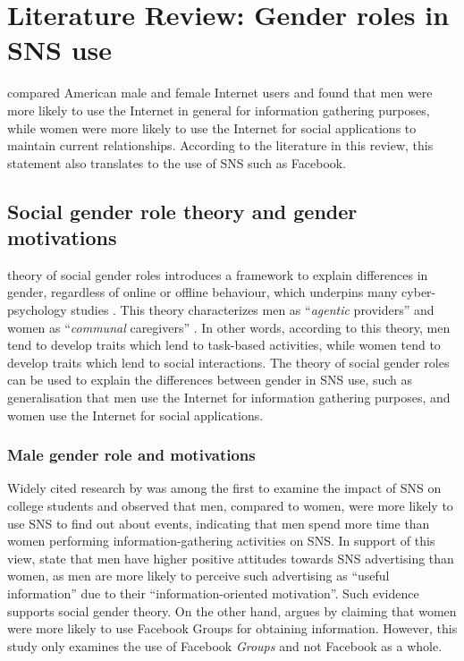 \section{Literature Review: Gender roles in SNS use}

\citet{Fallows2005} compared American male and female Internet users and found that men were more likely to use the Internet in general for information gathering purposes, while women were more likely to use the Internet for social applications to maintain current relationships. According to the literature in this review, this statement also translates to the use of SNS such as Facebook.

\subsection{Social gender role theory and gender motivations}

 theory of social gender roles introduces a framework to explain differences in gender, regardless of online or offline behaviour, which underpins many cyber-psychology studies \citep{Hum2011, Tifferet2014, Kimbrough2013}. This theory characterizes men as ``\emph{agentic} providers'' and women as ``\emph{communal} caregivers'' \citep[p. 1830]{Hum2011}. In other words, according to this theory, men tend to develop traits which lend to task-based activities, while women tend to develop traits which lend to social interactions. The theory of social gender roles can be used to explain the differences between gender in SNS use, such as  generalisation that men use the Internet for information gathering purposes, and women use the Internet for social applications.

\subsubsection{Male gender role and motivations}

Widely cited research by \citet{Raacke2008} was among the first to examine the impact of SNS on college students and observed that men, compared to women, were more likely to use SNS to find out about events, indicating that men spend more time than women performing information-gathering activities on SNS. In support of this view, \citet[p. 2]{Choi2014} state that men have higher positive attitudes towards SNS advertising than women, as men are more likely to perceive such advertising as ``useful information'' due to their ``information-oriented motivation''. Such evidence supports  social gender theory. On the other hand, \citet{Park2009} argues by claiming that women were more likely to use Facebook Groups for obtaining information. However, this study only examines the use of Facebook \emph{Groups} and not Facebook as a whole. 

